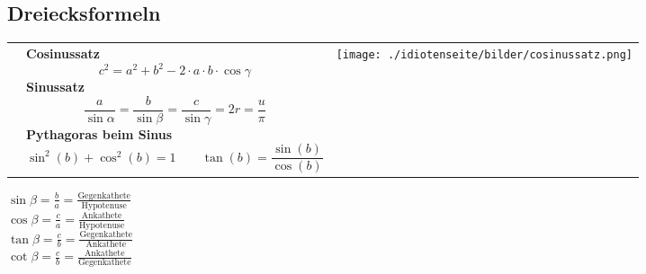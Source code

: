 \subsection{Dreiecksformeln}
\begin{tabular}{lll}
	& \parbox{9.5cm}{
		\textbf{Cosinussatz} \\
		$$c^2 = a^2 + b^2 - 2 \cdot a \cdot b \cdot \cos \gamma$$\\
		\textbf{Sinussatz} \\
		$$\frac{a}{\sin \alpha} = \frac{b}{\sin \beta} = \frac{c}{\sin \gamma} = 2r =
		\frac{u}{\pi}$$
		\textbf{Pythagoras beim Sinus}\\
		$$\sin^2(b)+\cos^2(b)=1 \qquad \tan(b)=\frac{\sin(b)}{\cos(b)}$$}
		
	& \parbox{8cm}{
		\texttt{[image: ./idiotenseite/bilder/cosinussatz.png]}}
\end{tabular}
\begin{center}
	\begin{multicols}{2}
		$\sin \beta = \frac ba =\frac{\text{Gegenkathete}}{\text{Hypotenuse}}$\\
		$\cos \beta = \frac ca =\frac{\text{Ankathete}}{\text{Hypotenuse}}$\\
		$\tan \beta = \frac cb =\frac{\text{Gegenkathete}}{\text{Ankathete}}$\\
		$\cot \beta = \frac cb =\frac{\text{Ankathete}}{\text{Gegenkathete}}$\\
	\end{multicols}
\end{center}

	